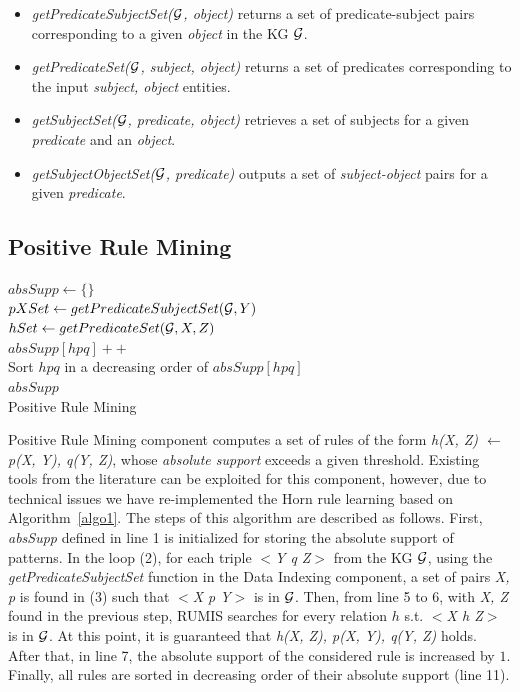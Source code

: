 \begin{itemize}
\item \textit{getPredicateSubjectSet($\mathcal{G}$, object)} returns a set of predicate-subject pairs corresponding to a given \textit{object} in the KG $\mathcal{G}$.
\item \textit{getPredicateSet($\mathcal{G}$, subject, object)} returns a set of predicates corresponding to the input \textit{subject, object} entities.
\item \textit{getSubjectSet($\mathcal{G}$, predicate, object)} retrieves a set of subjects for a given \textit{predicate} and an \textit{ object}.
\item \textit{getSubjectObjectSet($\mathcal{G}$, predicate)} outputs a set of \textit{subject-object} pairs for a given \textit{predicate}.
\end{itemize}

\subsection{Positive Rule Mining}

\IncMargin{1.5em}
\begin{algorithm}[h]
\DontPrintSemicolon
\SetAlgoLined
{}
\BlankLine
$absSupp \leftarrow \{\}$\\
\BlankLine
{} {
    \BlankLine
	$pXSet \leftarrow getPredicateSubjectSet(\mathcal{G}, Y)$\\
	 {
		$hSet \leftarrow getPredicateSet(\mathcal{G}, X, Z)$\\
		 {
			$absSupp[hpq]++$\\
		}
	}
}
\BlankLine
Sort $hpq$ in a decreasing order of $absSupp[hpq]$\\
\Return $absSupp$\\
\caption{Positive Rule Mining}
\label{algo1}
\end{algorithm}
\DecMargin{1.5em}

Positive Rule Mining component computes a set of rules of the form \textit{h(X, Z) $\leftarrow$ p(X, Y), q(Y, Z)}, whose \textit{absolute support} exceeds a given threshold. Existing tools from the literature can be exploited for this component, however, due to technical issues we have re-implemented the Horn rule learning based on Algorithm~\ref{algo1}. The steps of this algorithm are described as follows. First, \textit{absSupp} defined in line 1 is initialized for storing the absolute support of patterns. In the loop (2), for each triple \textit{$<$Y q Z$>$} from the KG $\mathcal{G}$, using the \textit{getPredicateSubjectSet} function in the Data Indexing component, a set of pairs \textit{X, p} is found in (3) such that \textit{$<$X p Y$>$} is in $\mathcal{G}$. Then, from line 5 to 6, with \textit{X, Z} found in the previous step, RUMIS searches for every relation $h$ s.t. \textit{$<$X h Z$>$} is in $\mathcal{G}$. At this point, it is guaranteed that \textit{h(X, Z), p(X, Y), q(Y, Z)} holds. After that, in line 7, the absolute support of the considered rule is increased by $1$. Finally, all rules are sorted in decreasing order of their absolute support (line 11).

